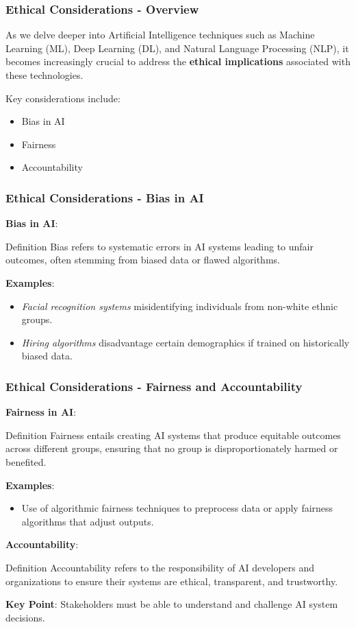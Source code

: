 \documentclass{beamer}
\begin{document}
\begin{frame}[fragile]
    \frametitle{Ethical Considerations - Overview}
    As we delve deeper into Artificial Intelligence techniques such as Machine Learning (ML), Deep Learning (DL), and Natural Language Processing (NLP), it becomes increasingly crucial to address the \textbf{ethical implications} associated with these technologies.
    
    Key considerations include:
    \begin{itemize}
        \item Bias in AI
        \item Fairness
        \item Accountability
    \end{itemize}
\end{frame}

\begin{frame}[fragile]
    \frametitle{Ethical Considerations - Bias in AI}
    \textbf{Bias in AI}:
    \begin{block}{Definition}
        Bias refers to systematic errors in AI systems leading to unfair outcomes, often stemming from biased data or flawed algorithms.
    \end{block}

    \textbf{Examples}:
    \begin{itemize}
        \item \textit{Facial recognition systems} misidentifying individuals from non-white ethnic groups.
        \item \textit{Hiring algorithms} disadvantage certain demographics if trained on historically biased data.
    \end{itemize}
\end{frame}

\begin{frame}[fragile]
    \frametitle{Ethical Considerations - Fairness and Accountability}
    \textbf{Fairness in AI}:
    \begin{block}{Definition}
        Fairness entails creating AI systems that produce equitable outcomes across different groups, ensuring that no group is disproportionately harmed or benefited.
    \end{block}

    \textbf{Examples}:
    \begin{itemize}
        \item Use of algorithmic fairness techniques to preprocess data or apply fairness algorithms that adjust outputs.
    \end{itemize}

    \textbf{Accountability}:
    \begin{block}{Definition}
        Accountability refers to the responsibility of AI developers and organizations to ensure their systems are ethical, transparent, and trustworthy.
    \end{block}
    \textbf{Key Point}: Stakeholders must be able to understand and challenge AI system decisions.
\end{frame}
\end{document}
